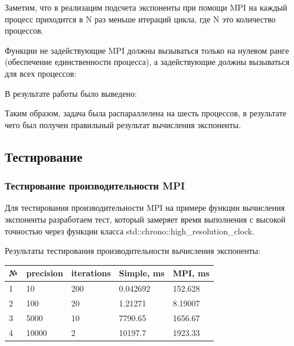 \documentclass[14pt,a4paper,report]{report}
\begin{document}


Заметим, что в реализацим подсчета экспоненты при помощи MPI на каждый процесс приходится в N раз меньше итераций цикла, где N это количество процессов.

Функции не задействующие MPI должны вызываться только на нулевом ранге (обеспечение единственности процесса), а задействующие должны вызываться для всех процессов:



В результате работы было выведено:



Таким образом, задача была распараллелена на шесть процессов, в результате чего был получен правильный результат вычисления экспоненты.

\subsection{Тестирование}

\subsubsection{Тестирование производительности MPI}

Для тестирования производительности MPI на примере функции вычисления экспоненты разработаем тест, который замеряет время выполнения с высокой точностью через функции класса std::chrono::high\_resolution\_clock.



\clearpage

Результаты тестирования производительности вычисления экспоненты:

\begin{table}[h!]
	\centering
	\bgroup
	\def\arraystretch{1}
	\begin{tabular}{ | m{0.8cm} | m{2.0cm} | m{1.8cm} | m{2.6cm} | m{2.6cm} | }
		\hline
		№ & precision & iterations & Simple, ms & MPI, ms \\ \hline
		1 & 10 & 200 & 0.042692 & 152.628 \\ \hline
		2 & 100 & 20 & 1.21271 & 8.19007 \\ \hline
		3 & 5000 & 10 & 7790.65 & 1656.67 \\ \hline
		4 & 10000 & 2 & 10197.7 & 1923.33 \\
		\hline
	\end{tabular}
	\egroup
\end{table}
\end{document}
